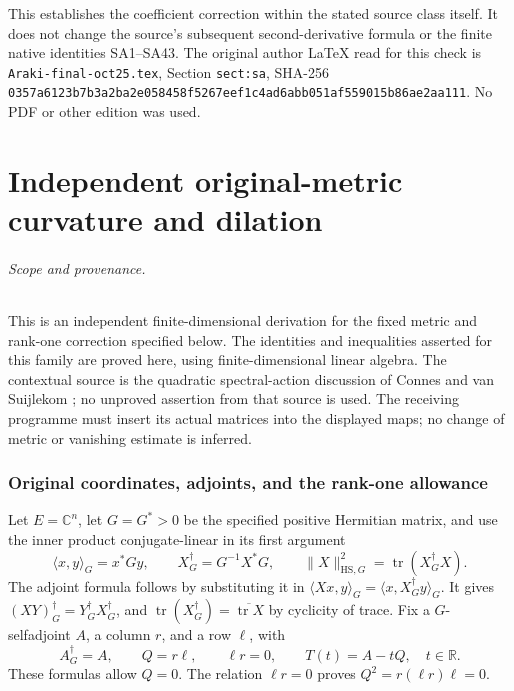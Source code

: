 \documentclass[11pt]{article}
\begin{document}
This establishes the coefficient correction within the
stated source class itself. It does not change the
source's subsequent second-derivative formula or the
finite native identities SA1--SA43.
The original author LaTeX read for this check is
\texttt{Araki-final-oct25.tex}, Section \texttt{sect:sa},
SHA-256
\texttt{0357a6123b7b3a2ba2e058458f5267eef1c4ad6abb051af559015b86ae2aa111}.
No PDF or other edition was used.

\endgroup

\clearpage\begingroup
\part*{Independent original-metric curvature and dilation}
\newtheorem{samtheorem}{Theorem}
\newtheorem{samlemma}{Lemma}
\newcommand{\samtr}{\operatorname{tr}}
\newcommand{\samrank}{\operatorname{rank}}
\newcommand{\samspec}{\operatorname{spec}}
\newcommand{\samRea}{\operatorname{Re}}
\newcommand{\samIma}{\operatorname{Im}}
\newcommand{\samadj}{\dagger_G}



\paragraph{Scope and provenance.}
This is an independent finite-dimensional derivation for the fixed metric and
rank-one correction specified below. The identities and inequalities asserted
for this family are proved here, using finite-dimensional linear algebra.
The contextual source is the quadratic spectral-action
discussion of Connes and van Suijlekom \cite{sam:CvS}; no unproved assertion from that
source is used. The receiving programme must insert its actual matrices into
the displayed maps; no change of metric or vanishing estimate is inferred.

\section{Original coordinates, adjoints, and the rank-one allowance}

Let \(E=\mathbb C^n\), let \(G=G^*>0\) be the specified positive Hermitian
matrix, and use the inner product conjugate-linear in its first argument
\begin{equation}
 \langle x,y\rangle_G=x^*Gy,\qquad
 X^\samadj=G^{-1}X^*G,\qquad
 \|X\|_{\mathrm{HS},G}^2=\samtr(X^\samadj X).
 \tag{MC1}\label{sam:MC1}
\end{equation}
The adjoint formula follows by substituting it in
\(\langle Xx,y\rangle_G=\langle x,X^\samadj y\rangle_G\).
It gives \((XY)^\samadj=Y^\samadj X^\samadj\), and
\(\samtr(X^\samadj)=\overline{\samtr X}\) by cyclicity of trace.
Fix a \(G\)-selfadjoint \(A\), a column \(r\), and a row \(\ell\), with
\begin{equation}
 A^\samadj=A,\qquad Q=r\ell,\qquad \ell r=0,\qquad
 T(t)=A-tQ,\quad t\in\mathbb R.
 \tag{MC2}\label{sam:MC2}
\end{equation}
These formulas allow \(Q=0\). The relation \(\ell r=0\) proves
\(Q^2=r(\ell r)\ell=0\).
\end{document}
